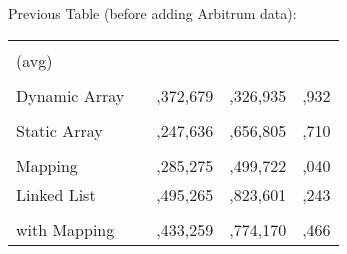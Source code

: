 



Previous Table (before adding Arbitrum data):

\begin{table}[t]
\setlength{\tabcolsep}{0.1\tabcolsep}%
\centering
\begin{tabular} {|>{\centering}m{2.5cm} |>{\centering}m{0.5cm} |>{\centering}m{1.5cm} |>{\centering}m{1.8cm} |>{\centering\arraybackslash}m{1.5cm}|}

\multicolumn{1}{c}{} & 

\headrow{\footnotesize Max trades (w.c.)} & 
\headrow{\footnotesize Gas for max trades} & 
\headrow{\footnotesize Gas for 1000 trades} & 
\headrow{\footnotesize \shortstack{ Gas for order \\ (avg)}} \\ \hline

\shortstack{Heap with \\ Dynamic Array}       & 38            & 5,372,679                   	& 457,326,935      & 207,932     \\ \hline
\shortstack{Heap with \\ Static Array}         	& 42            & 5,247,636                  	& 333,656,805         & 197,710         \\ \hline
\shortstack{Heap with \\ Mapping} 		& 46           	 & 5,285,275                     & 226,499,722    & 215,040           \\ \hline
Linked List                     	& 152            & 5,495,265                     & 35,823,601         & 735,243             \\ \hline
\shortstack{Linked List \\ with Mapping}     	& 86             & 5,433,259                     & 62,774,170        &  547,466              \\ \hline


\end{tabular}
\end{table}
